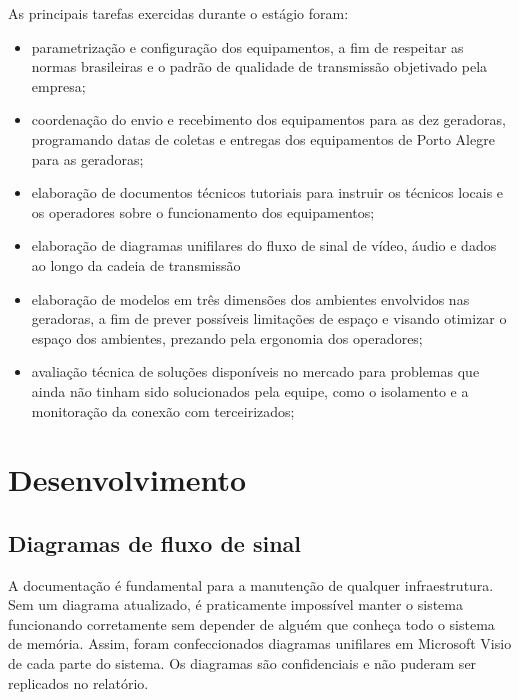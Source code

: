\documentclass[
	12pt,				%
	oneside,			%
	a4paper,			%
	brazil
	]{abntex2}
\begin{document}
As principais tarefas exercidas durante o estágio foram:

\begin{itemize}

\item parametrização e configuração dos equipamentos, a fim de respeitar as normas brasileiras e o padrão de qualidade de transmissão objetivado pela empresa;

\item coordenação do envio e recebimento dos equipamentos para as dez geradoras, programando datas de coletas e entregas dos equipamentos de Porto Alegre para as geradoras;

\item elaboração de documentos técnicos tutoriais para instruir os técnicos locais e os operadores sobre o funcionamento dos equipamentos;

\item elaboração de diagramas unifilares do fluxo de sinal de vídeo, áudio e dados ao longo da cadeia de transmissão

\item elaboração de modelos em três dimensões dos ambientes envolvidos nas geradoras, a fim de prever possíveis limitações de espaço e visando otimizar o espaço dos ambientes, prezando pela ergonomia dos operadores;

\item avaliação técnica de soluções disponíveis no mercado para problemas que ainda não tinham sido solucionados pela equipe, como o isolamento e a monitoração da conexão com terceirizados;
\end{itemize}

\chapter{Desenvolvimento}

\section{Diagramas de fluxo de sinal}

A documentação é fundamental para a manutenção de qualquer infraestrutura. Sem um diagrama atualizado, é praticamente impossível manter o sistema funcionando corretamente sem depender de alguém que conheça todo o sistema de memória. Assim, foram confeccionados diagramas unifilares em Microsoft Visio de cada parte do sistema. Os diagramas são confidenciais e não puderam ser replicados no relatório.
\end{document}
